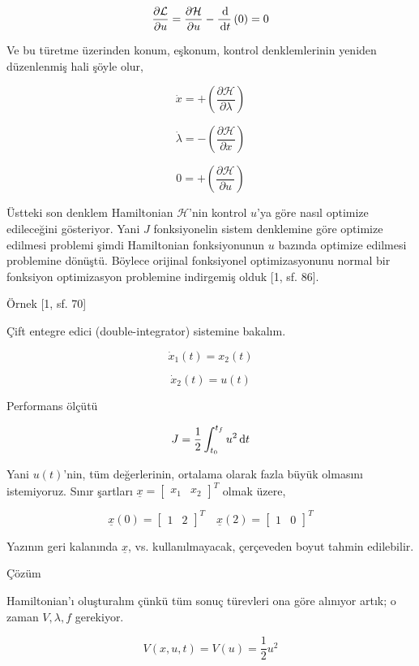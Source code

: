 \documentclass[12pt,fleqn]{article}\usepackage{../../common}
\begin{document}
$$
\frac{\partial \mathcal{L}}{\partial u} = 
\frac{\partial \mathcal{H}}{\partial u} - 
\frac{\,\mathrm{d}}{\,\mathrm{d} t} \left( 0 \right)   = 0
$$

Ve bu türetme üzerinden konum, eşkonum, kontrol denklemlerinin yeniden
düzenlenmiş hali şöyle olur,

$$
\dot{x} = + \left( \frac{\partial \mathcal{H}}{\partial \lambda} \right)
$$

$$
\dot{\lambda} = - \left( \frac{\partial \mathcal{H}}{\partial x} \right)
$$

$$
0 = + \left( \frac{\partial \mathcal{H}}{\partial u} \right)
$$


Üstteki son denklem Hamiltonian $\mathcal{H}$'nin kontrol $u$'ya göre
nasıl optimize edileceğini gösteriyor. Yani $J$ fonksiyonelin sistem
denklemine göre optimize edilmesi problemi şimdi Hamiltonian
fonksiyonunun $u$ bazında optimize edilmesi problemine
dönüştü. Böylece orijinal fonksiyonel optimizasyonunu normal bir
fonksiyon optimizasyon problemine indirgemiş olduk [1, sf. 86].

Örnek [1, sf. 70]

Çift entegre edici (double-integrator) sistemine bakalım. 

$$
\dot{x}_1(t) = x_2(t)
$$

$$
\dot{x}_2(t) = u(t)
$$

Performans ölçütü 

$$
J = \frac{1}{2} \int _{t_0}^{t_f} u^2 \,\mathrm{d} t
$$

Yani $u(t)$'nin, tüm değerlerinin, ortalama olarak fazla büyük
olmasını istemiyoruz. Sınır şartları $\underline{x} =
\left[\begin{array}{cc} x_1 & x_2 \end{array}\right]^T$ 
olmak üzere,

$$
\underline{x}(0) = \left[\begin{array}{cc} 1 & 2 \end{array}\right]^T \quad 
\underline{x}(2) = \left[\begin{array}{cc} 1 & 0 \end{array}\right]^T 
$$

Yazının geri kalanında $\underline{x}$, vs. kullanılmayacak, çerçeveden
boyut tahmin edilebilir.

Çözüm

Hamiltonian'ı oluşturalım çünkü tüm sonuç türevleri ona göre alınıyor
artık; o zaman $V,\lambda,f$ gerekiyor. 

$$
V(x,u,t) = V(u) = \frac{1}{2} u^2
$$
\end{document}
